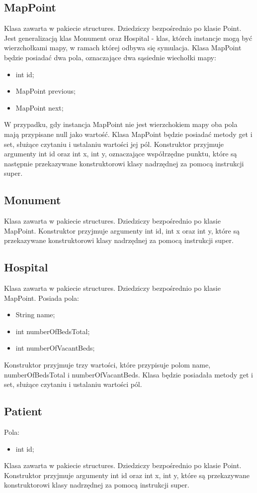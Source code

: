 \documentclass{article}
\begin{document}
    \subsection{MapPoint}
    Klasa zawarta w pakiecie structures. Dziedziczy bezpośrednio po klasie Point. Jest generalizacją klas Monument oraz Hospital - klas, którch instancje mogą być wierzchołkami mapy, w ramach której odbywa się symulacja.
    Klasa MapPoint będzie posiadać dwa pola, oznaczające dwa sąsiednie wiechołki mapy:
    \begin{itemize}
        \item int id;
        \item MapPoint previous;
        \item MapPoint next;
    \end{itemize}
    W przypadku, gdy instancja MapPoint nie jest wierzchokiem mapy oba pola mają przypisane null jako wartość. Klasa MapPoint będzie posiadać metody get i set, służące czytaniu i ustalaniu wartości jej pól. Konstruktor przyjmuje argumenty int id oraz int x, int y, oznaczające współrzędne punktu, które są następnie przekazywane konstruktorowi klasy nadrzędnej za pomocą instrukcji super.

    \subsection{Monument}
    Klasa zawarta w pakiecie structures. Dziedziczy bezpośrednio po klasie MapPoint. Konstruktor przyjmuje argumenty int id, int x oraz int y, które są przekazywane  konstruktorowi klasy nadrzędnej za pomocą instrukcji super.

    \subsection{Hospital}
    Klasa zawarta w pakiecie structures. Dziedziczy bezpośrednio po klasie MapPoint. Posiada pola:
    \begin{itemize}
        \item String name;
        \item int numberOfBedsTotal;
        \item int numberOfVacantBeds;
    \end{itemize}
    Konstruktor przyjmuje trzy wartości, które przypisuje polom  name, numberOfBedsTotal i numberOfVacantBeds. Klasa będzie posiadała metody get i set, służące czytaniu i ustalaniu wartości pól.

    \subsection{Patient}
    Pola:
    \begin{itemize}
        \item int id;
    \end{itemize}
    Klasa zawarta w pakiecie structures. Dziedziczy bezpośrednio po klasie Point. Konstruktor przyjmuje argumenty int id oraz int x, int y, które są przekazywane  konstruktorowi klasy nadrzędnej za pomocą instrukcji super.
\end{document}
